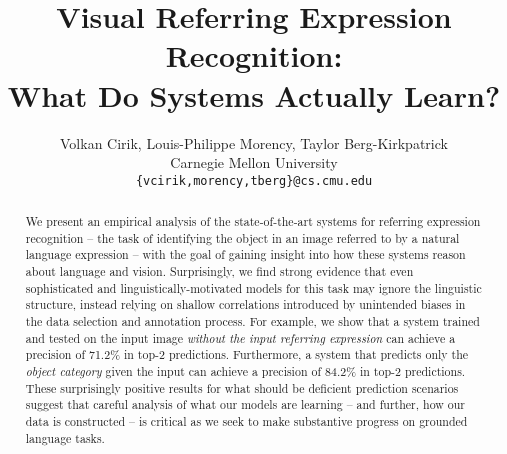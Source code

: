 \documentclass[11pt,a4paper]{article}
\title{Visual Referring Expression Recognition: \\ What Do Systems Actually Learn?}
\author{
  Volkan Cirik, Louis-Philippe Morency, Taylor Berg-Kirkpatrick  \\
Carnegie Mellon University\\
\texttt{\{vcirik,morency,tberg\}@cs.cmu.edu} \\
}
\begin{document}
\maketitle
\begin{abstract}
We present an empirical analysis of the state-of-the-art systems for referring expression recognition -- the task of identifying the object in an image referred to by a natural language expression -- with the goal of gaining insight into how these systems reason about language and vision. Surprisingly, we find strong evidence that even sophisticated and linguistically-motivated models for this task may ignore the linguistic structure, instead relying on shallow correlations introduced by unintended biases in the data selection and annotation process. For example, we show that a system trained and tested on the input image \emph{without the input referring expression} can achieve a precision of 71.2\% in top-2 predictions.
Furthermore, a system that predicts only the \emph{object category} given the input can achieve a precision of 84.2\% in top-2 predictions. These surprisingly positive results for what should be deficient prediction scenarios suggest that careful analysis of what our models are learning -- and further, how our data is constructed -- is critical as we seek to make substantive progress on grounded language tasks.
\end{abstract}
\newcommand \figurethree{
\begin{figure*}[h!]
\vspace{-5pt}
\centering
\texttt{[image: fig\_fig4.pdf]}
\caption{Overview of Neural Sieves. Sieve I filters object types having multiple instances. Sieve II filters objects of one category mentioned in referring expression.
Objects of the same category have the same color frames. Best seen in color.}\label{fig2}
\vspace{-5pt}
\end{figure*}
}
\end{document}
